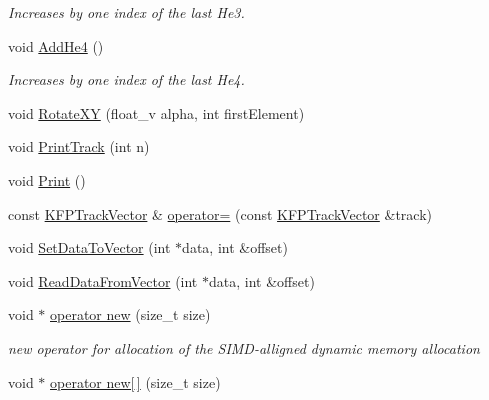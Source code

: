 \begin{DoxyCompactItemize}
\begin{DoxyCompactList}\small\item\em Increases by one index of the last He3. \end{DoxyCompactList}\item 
void \hyperlink{classKFPTrackVector_aadd8fff889c52d42edba8058f7e519a5}{Add\+He4} ()\hypertarget{classKFPTrackVector_aadd8fff889c52d42edba8058f7e519a5}{}\label{classKFPTrackVector_aadd8fff889c52d42edba8058f7e519a5}

\begin{DoxyCompactList}\small\item\em Increases by one index of the last He4. \end{DoxyCompactList}\item 
void \hyperlink{classKFPTrackVector_aa61672d4374848016858d15e02d8aa57}{Rotate\+XY} (float\+\_\+v alpha, int first\+Element)
\item 
void \hyperlink{classKFPTrackVector_a154cfe293e56162a8d0368c72a1c5f76}{Print\+Track} (int n)
\item 
void \hyperlink{classKFPTrackVector_a82dc658eef2a7ddeeb0ebc524167f4e7}{Print} ()
\item 
const \hyperlink{classKFPTrackVector}{K\+F\+P\+Track\+Vector} \& \hyperlink{classKFPTrackVector_ae8fdf7dcaa2c4f1a15d8a6961616046c}{operator=} (const \hyperlink{classKFPTrackVector}{K\+F\+P\+Track\+Vector} \&track)
\item 
void \hyperlink{classKFPTrackVector_ae1172a6bfa205c22301513607704c267}{Set\+Data\+To\+Vector} (int $\ast$data, int \&offset)
\item 
void \hyperlink{classKFPTrackVector_a7702c695e9d646174ccd54adbbe2dfa8}{Read\+Data\+From\+Vector} (int $\ast$data, int \&offset)
\item 
void $\ast$ \hyperlink{classKFPTrackVector_ad1d3845c4ab11316cff23e7805d4b296}{operator new} (size\+\_\+t size)\hypertarget{classKFPTrackVector_ad1d3845c4ab11316cff23e7805d4b296}{}\label{classKFPTrackVector_ad1d3845c4ab11316cff23e7805d4b296}

\begin{DoxyCompactList}\small\item\em new operator for allocation of the S\+I\+M\+D-\/alligned dynamic memory allocation \end{DoxyCompactList}\item 
void $\ast$ \hyperlink{classKFPTrackVector_ab458cc41f6e76217acfbbb5a4337df94}{operator new\mbox{[}$\,$\mbox{]}} (size\+\_\+t size)\hypertarget{classKFPTrackVector_ab458cc41f6e76217acfbbb5a4337df94}{}\label{classKFPTrackVector_ab458cc41f6e76217acfbbb5a4337df94}


\end{DoxyCompactItemize}
